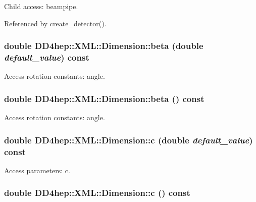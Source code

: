 Child access: beampipe. 

Referenced by create\_\-detector().\hypertarget{struct_d_d4hep_1_1_x_m_l_1_1_dimension_a474e98f605818ece737dc8dfbf145c6a}{
\subsubsection[{beta}]{\setlength{\rightskip}{0pt plus 5cm}double DD4hep::XML::Dimension::beta (double {\em default\_\-value}) const}}
\label{struct_d_d4hep_1_1_x_m_l_1_1_dimension_a474e98f605818ece737dc8dfbf145c6a}


Access rotation constants: angle. \hypertarget{struct_d_d4hep_1_1_x_m_l_1_1_dimension_a59e26f703efecee96097d60dc0632824}{
\subsubsection[{beta}]{\setlength{\rightskip}{0pt plus 5cm}double DD4hep::XML::Dimension::beta () const}}
\label{struct_d_d4hep_1_1_x_m_l_1_1_dimension_a59e26f703efecee96097d60dc0632824}


Access rotation constants: angle. \hypertarget{struct_d_d4hep_1_1_x_m_l_1_1_dimension_a10c3a02a90ba7df601823b9b77e313b2}{
\subsubsection[{c}]{\setlength{\rightskip}{0pt plus 5cm}double DD4hep::XML::Dimension::c (double {\em default\_\-value}) const}}
\label{struct_d_d4hep_1_1_x_m_l_1_1_dimension_a10c3a02a90ba7df601823b9b77e313b2}


Access parameters: c. \hypertarget{struct_d_d4hep_1_1_x_m_l_1_1_dimension_acaf9e1114462a7ae94110ca93d9c923c}{
\subsubsection[{c}]{\setlength{\rightskip}{0pt plus 5cm}double DD4hep::XML::Dimension::c () const}}
\label{struct_d_d4hep_1_1_x_m_l_1_1_dimension_acaf9e1114462a7ae94110ca93d9c923c}


